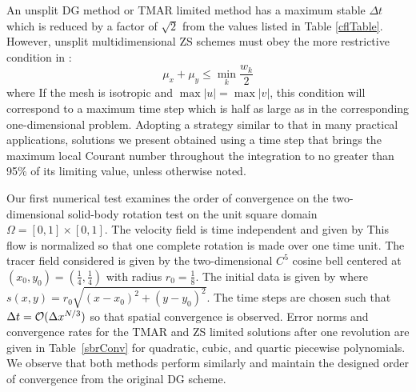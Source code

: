 \documentclass{ametsoc}
\begin{document}
An unsplit DG method or TMAR limited method has a maximum stable $\Delta t$ which is reduced by a factor of $\sqrt{2}$ from the values listed in Table \ref{cflTable}. However, unsplit multidimensional ZS schemes must obey the more restrictive condition in \citep{Zhang2010}: 
\begin{equation}
\mu_x + \mu_y \leq \min \limits_{k} \frac{w_k}{2}
\label{eqn:2dZScfl}
\end{equation}
where 
If the mesh is isotropic and $\max |u| = \max |v|$, this condition will correspond to a maximum time step which is half as large as in the corresponding one-dimensional problem. Adopting a strategy similar to that in many practical applications, solutions we present obtained using a time step that brings the maximum local Courant number throughout the integration to no greater than 95\% of its limiting value, unless otherwise noted.

Our first numerical test examines the order of convergence on the two-dimensional solid-body rotation test on the unit square domain $\Omega = [0,1] \times [0,1]$. The velocity field is time independent and given by
This flow is normalized so that one complete rotation is made over one time unit. The tracer field considered is given by the two-dimensional $C^5$ cosine bell centered at $(x_0,y_0) = (\frac{1}{4},\frac{1}{4})$ with radius $r_0 = \frac{1}{8}$. The initial data is given by 
where $s(x,y) = r_0 \sqrt{(x-x_0)^2+(y-y_0)^2}$. The time steps are chosen such that $\Delta t = \mathcal{O}(\Delta x^{N/3})$ so that spatial convergence is observed. Error norms and convergence rates for the TMAR and ZS limited solutions after one revolution are given in Table~\ref{sbrConv} for quadratic, cubic, and quartic piecewise polynomials. We observe that both methods perform similarly and maintain the designed order of convergence from the original DG scheme.
\end{document}
